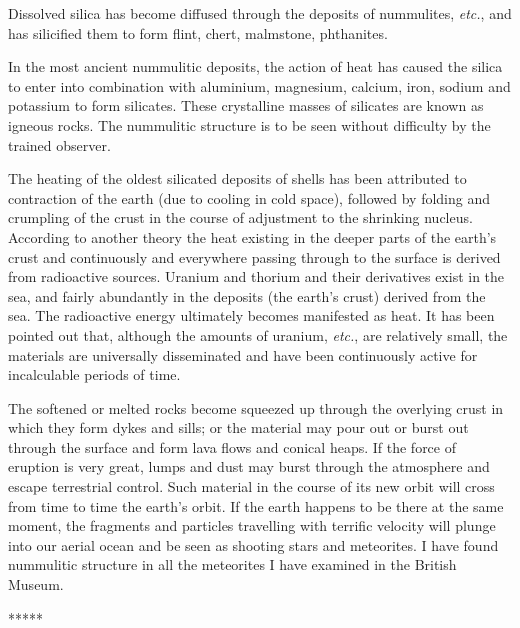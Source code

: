 \documentclass[a4paper, 12pt, oneside]{article}
\begin{document}
Dissolved silica has become diffused through the deposits of nummulites, \emph{etc.}, and has silicified them to form flint, chert, malmstone, phthanites.

In the most ancient nummulitic deposits, the action of heat has caused the silica to enter into combination with aluminium, magnesium, calcium, iron, sodium and potassium to form silicates. These crystalline masses of silicates are known as igneous rocks. The nummulitic structure is to be seen without difficulty by the trained observer.

The heating of the oldest silicated deposits of shells has been attributed to contraction of the earth (due to cooling in cold space), followed by folding and crumpling of the crust in the course of adjustment to the shrinking nucleus. According to another theory the heat existing in the deeper parts of the earth's crust and continuously and everywhere passing through to the surface is derived from radioactive sources. Uranium and thorium and their derivatives exist in the sea, and fairly abundantly in the deposits (the earth's crust) derived from the sea. The radioactive energy ultimately becomes manifested as heat. It has been pointed out that, although the amounts of uranium, \emph{etc.}, are relatively small, the materials are universally disseminated and have been continuously active for incalculable periods of time.

The softened or melted rocks become squeezed up through the overlying crust in which they form dykes and sills; or the material may pour out or burst out through the surface and form lava flows and conical heaps. If the force of eruption is very great, lumps and dust may burst through the atmosphere and escape terrestrial control. Such material in the course of its new orbit will cross from time to time the earth's orbit. If the earth happens to be there at the same moment, the fragments and particles travelling with terrific velocity will plunge into our aerial ocean and be seen as shooting stars and meteorites. I have found nummulitic structure in all the meteorites I have examined in the British Museum.

\centerline{*\hspace{15mm}*\hspace{15mm}*\hspace{15mm}*\hspace{15mm}*}
\bigskip
\end{document}
